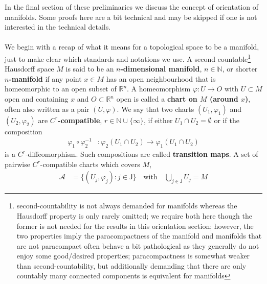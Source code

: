 In the final section of these preliminaries we discuss the concept of orientation of manifolds. Some proofs here are a bit technical and may be skipped if one is not interested in the technical details.
\\\\
We begin with a recap of what it means for a topological space to be a manifold, just to make clear which standards and notations we use. A second countable\footnote{second-countability is not always demanded for manifolds whereas the Hausdorff property is only rarely omitted; we require both here though the former is not needed for the results in this orientation section; however, the two properties imply the paracompactness of the manifold and manifolds that are not paracompact often behave a bit pathological as they generally do not enjoy some good/desired properties; paracompactness is somewhat weaker than second-countability, but additionally demanding that there are only countably many connected components is equivalent for manifolds} Hausdorff space $M$ is said to be an \textbf{$n$-dimensional manifold}, $n \in \mathbb{N}$, or shorter \textbf{$n$-manifold} if any point $x \in M$ has an open neighbourhood that is homeomorphic to an open subset of $\mathbb{R}^{n}$. A homeomorphism $\varphi \colon U \to O$ with $U \subset M$ open and containing $x$ and $O \subset \mathbb{R}^{n}$ open is called a \textbf{chart on $M$ (around $x$)}, often also written as a pair $(U,\varphi)$. We say that two charts $(U_{1},\varphi_{1})$ and $(U_{2},\varphi_{2})$ are \textbf{$C^{r}$-compatible}, $r \in \mathbb{N} \cup \lbrace \infty \rbrace$, if either $U_{1} \cap U_{2} = \emptyset$ or if the composition
\begin{align*}
  \varphi_{1}
  \circ
  \varphi_{2}^{-1}
  &\colon
  \varphi_{2}(U_{1} \cap U_{2})
  \to
  \varphi_{1}(U_{1} \cap U_{2})
\end{align*}
is a $C^{r}$-diffeomorphism. Such compositions are called \textbf{transition maps}. A set of pairwise $C^{r}$-compatible charts which covers $M$,
\begin{align*}
  \mathcal{A}
  &=
  \lbrace
    (U_{j},\varphi_{j})
    \colon
    j
    \in
    \mathsf{J}
  \rbrace
  \quad
  \text{with}
  \quad
  \bigcup_{j \in \mathsf{J}}
  U_{j}
  =
  M
\end{align*}
